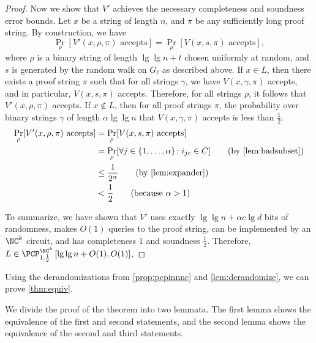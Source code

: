 \documentclass[]{article}
\newcommand{\PCPcs}[5]{\PCP^{#1}_{#2, #3}\left[#4, #5\right]}
\begin{document}
\begin{proof}
  Now we show that $V'$ achieves the necessary completeness and soundness error bounds.
  Let $x$ be a string of length $n$, and $\pi$ be any sufficiently long proof string.
  By construction, we have
  \begin{equation*}
    \Pr_\rho[V'(x, \rho, \pi) \text{ accepts}] = \Pr_\rho[V(x, s, \pi) \text{ accepts}],
  \end{equation*}
  where $\rho$ is a binary string of length $\lg \lg n + t$ chosen uniformly at random, and $s$ is generated by the random walk on $G_\ell$ as described above.
  If $x \in L$, then there exists a proof string $\pi$ such that for all strings $\gamma$, we have $V(x, \gamma, \pi)$ accepts, and in particular, $V(x, s, \pi)$ accepts.
  Therefore, for all strings $\rho$, it follows that $V'(x, \rho, \pi)$ accepts.
  If $x \notin L$, then for all proof strings $\pi$, the probability over binary strings $\gamma$ of length $\alpha \lg \lg n$ that $V(x, \gamma, \pi)$ accepts is less than $\frac{1}{2}$.
  \begin{align*}
    \Pr_\rho[V'(x, \rho, \pi) \text{ accepts}] & = \Pr_\rho[V(x, s, \pi) \text{ accepts}] \\
    & = \Pr_\rho[\forall j \in \{1, \dotsc, \alpha\} \colon i_{jc} \in C] \qquad \text{(by \autoref{lem:badsubset})} \\
    & \leq \frac{1}{2^\alpha} \qquad \text{(by \autoref{lem:expander})} \\
    & < \frac{1}{2} \qquad \text{(because } \alpha > 1)
  \end{align*}

  To summarize, we have shown that $V'$ uses exactly $\lg \lg n + \alpha c \lg d$ bits of randomness, makes $O(1)$ queries to the proof string, can be implemented by an $\NC^k$ circuit, and has completeness 1 and soundness $\frac{1}{2}$.
  Therefore, $L \in \PCPcs{\NC^k}{1}{\frac{1}{2}}{\lg \lg n + O(1)}{O(1)}$.
\end{proof}

Using the derandomizations from \autoref{prop:pcpinnnc} and \autoref{lem:derandomize}, we can prove \autoref{thm:equiv}.

We divide the proof of the theorem into two lemmata.
The first lemma shows the equivalence of the first and second statements, and the second lemma shows the equivalence of the second and third statements.
\end{document}
